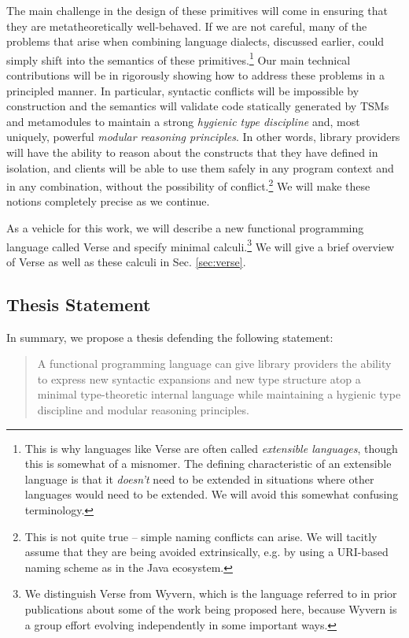 The main challenge in the design of these primitives will come in ensuring that they are metatheoretically well-behaved. If we are not careful, many of the problems  that arise when combining language dialects, discussed earlier, could simply shift into the semantics of these primitives.\footnote{This is why languages  like Verse are often called \emph{extensible languages}, though this is somewhat of a misnomer. The defining characteristic of an extensible language is that it \emph{doesn't} need to be extended in situations where other languages would need to be extended. We will avoid this somewhat confusing terminology.} Our main technical contributions will be in rigorously showing how to address these problems in a principled manner. In particular, syntactic conflicts will be impossible by construction and the semantics will validate code statically generated by TSMs and metamodules to maintain a strong \emph{hygienic type discipline} and, most uniquely, powerful \emph{modular reasoning principles}. In other words, library providers will have the ability to reason about the constructs that they have defined in isolation, and clients will be able to use them safely in any program context and in any combination, without the possibility of conflict.\footnote{This is not quite true -- simple naming conflicts can arise. We will tacitly assume that they are being avoided extrinsically, e.g. by using a URI-based naming scheme as in the Java ecosystem.} We will make these notions completely precise as we continue.

As a vehicle for this work, we will describe a new functional programming language called Verse and specify  minimal calculi.\footnote{We distinguish Verse from Wyvern, which is the language referred to in prior publications about some of the work being proposed here, because Wyvern is a group effort evolving independently in some important ways.} We will give a brief overview of Verse as well as these calculi in Sec. \ref{sec:verse}.

\subsection{Thesis Statement}
In summary, we propose a thesis defending the following statement:
\begin{quote}
A functional programming language can give library providers the ability to %
express new syntactic expansions and new type structure atop a minimal type-theoretic internal language while maintaining a hygienic type discipline and modular reasoning principles. %
\end{quote}

